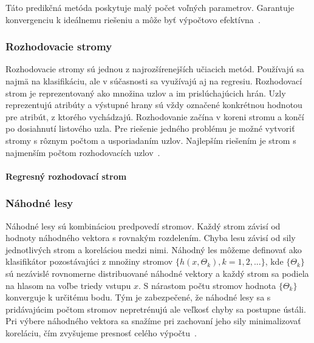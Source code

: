 \documentclass[a4paper,slovak,12pt,appendix]{article}
\begin{document}
Táto predikčná metóda poskytuje malý počet voľných parametrov. Garantuje
konvergenciu k ideálnemu riešeniu a môže byť výpočtovo
efektívna~\cite{Sapankevych2009}.


\subsubsection{Rozhodovacie stromy}
Rozhodovacie stromy sú jednou z najrozšírenejších učiacich metód. Používajú sa
najmä na klasifikáciu, ale v súčasnosti sa využívajú aj na regresiu.
Rozhodovací strom je reprezentovaný ako množina uzlov a im prislúchajúcich
hrán. Uzly reprezentujú atribúty a výstupné hrany sú vždy označené konkrétnou
hodnotou pre atribút, z ktorého vychádzajú. Rozhodovanie začína v koreni stromu
a končí po dosiahnutí listového uzla. Pre riešenie jedného problému je možné
vytvoriť stromy s rôznym počtom a usporiadaním uzlov. Najlepším riešením je
strom s najmenším počtom rozhodovacích uzlov~\cite{Merz1998}.

\paragraph{Regresný rozhodovací strom}


\subsubsection{Náhodné lesy}
Náhodné lesy sú kombináciou predpovedí stromov. Každý strom závisí od hodnoty
náhodného vektora s rovnakým rozdelením. Chyba lesu závisí od sily jednotlivých
strom a koreláciou medzi nimi. Náhodný les môžeme definovať ako klasifikátor
pozostávajúci z množiny stromov $\{h(x, \Theta_k), k=1, 2, ... \}$, kde
$\{\Theta_k\}$ sú nezávislé rovnomerne distribuované náhodné vektory a každý
strom sa podiela na hlasom na voľbe triedy vstupu $x$. S nárastom počtu stromov
hodnota $\{\Theta_k\}$ konverguje k určitému bodu. Tým je zabezpečené, že
náhodné lesy sa s pridávajúcim počtom stromov nepretrénujú ale veľkosť chyby sa
postupne ústáli. Pri výbere náhodného vektora sa snažíme pri zachovaní jeho
sily minimalizovať koreláciu, čím zvyšujeme presnosť celého
výpočtu~\cite{Breiman2001}.
\end{document}
